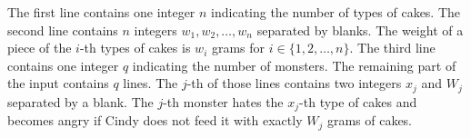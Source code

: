 The first line contains one integer $n$ indicating the number of types of cakes.
The second line contains $n$ integers $w_1,w_2,\ldots,w_n$ separated by blanks. 
The weight of a piece of the $i$-th types of cakes is $w_i$ grams 
for $i\in\{1,2,\dots,n\}$.
The third line contains one integer $q$ indicating the number of monsters.
The remaining part of the input contains $q$ lines.
The $j$-th of those lines contains two integers $x_j$ and $W_j$ separated by 
a blank.
The $j$-th monster hates the $x_j$-th type of cakes and becomes angry
if Cindy does not feed it with exactly $W_j$ grams of cakes.
